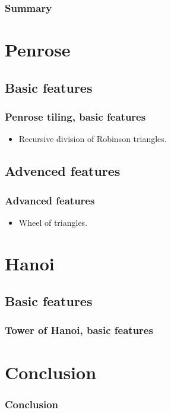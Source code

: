 \documentclass{beamer}
\begin{document}
	\begin{frame}
		\frametitle{Summary}
		\tableofcontents
	\end{frame}
	
	\section{Penrose}
	\subsection{Basic features}
	\begin{frame}
		\frametitle{Penrose tiling, basic features}
		\begin{itemize}
			\item Recursive division of Robinson triangles.
		\end{itemize}
	\end{frame}
	
	\subsection{Advenced features}
	\begin{frame}
		\frametitle{Advanced features}
		\begin{itemize}
			\item Wheel of triangles.
		\end{itemize}
	\end{frame}
	
	\section{Hanoi}
	\subsection{Basic features}
	\begin{frame}
		\frametitle{Tower of Hanoi, basic features}
	\end{frame}
	
	\section*{Conclusion}
	\begin{frame}
		\frametitle{Conclusion}
	\end{frame}
\end{document}
